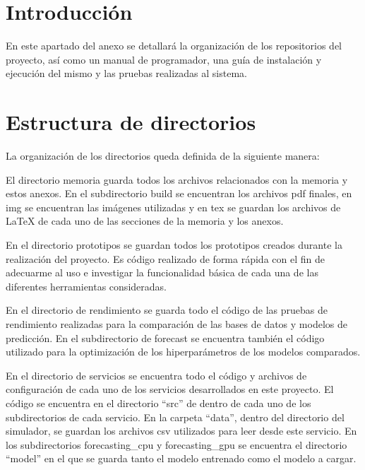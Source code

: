 
\section{Introducción}

En este apartado del anexo se detallará la organización de los repositorios del proyecto, así
como un manual de programador, una guía de instalación y ejecución del mismo y las pruebas realizadas
al sistema.

\section{Estructura de directorios}

La organización de los directorios queda definida de la siguiente manera:


El directorio memoria guarda todos los archivos relacionados con la memoria y estos anexos. En 
el subdirectorio build se encuentran los archivos pdf finales, en img se encuentran las imágenes 
utilizadas y en tex se guardan los archivos de LaTeX de cada uno de las secciones de la memoria y 
los anexos.


En el directorio prototipos se guardan todos los prototipos creados durante la realización del 
proyecto. Es código realizado de forma rápida con el fin de adecuarme al uso e investigar la funcionalidad
básica de cada una de las diferentes herramientas consideradas.


En el directorio de rendimiento se guarda todo el código de las pruebas de rendimiento realizadas 
para la comparación de las bases de datos y modelos de predicción. En el subdirectorio de 
forecast se encuentra también el código utilizado para la optimización de los hiperparámetros de 
los modelos comparados.


En el directorio de servicios se encuentra todo el código y archivos de configuración de cada 
uno de los servicios desarrollados en este proyecto. El código se encuentra en el directorio
``src'' de dentro de cada uno de los subdirectorios de cada servicio. En la carpeta ``data'',
dentro del directorio del simulador, se guardan los archivos csv utilizados para leer desde 
este servicio. En los subdirectorios forecasting\_cpu y forecasting\_gpu se encuentra el directorio
``model'' en el que se guarda tanto el modelo entrenado como el modelo a cargar.

